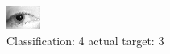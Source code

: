 \begin{figure}[h!]
\begin{center}
\includegraphics[width=0.60\columnwidth]{figures/ID1296_class_4_target_3.png}
\end{center}
\caption{ Classification: 4 actual target: 3}
\label{fig:ID1296_class_4_target_3}
\end{figure}
